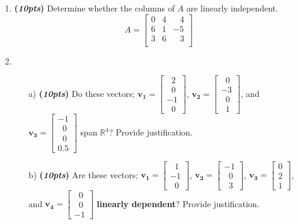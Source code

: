 \documentclass[12pt]{article}%
\begin{document}
\begin{enumerate}
     \newpage



    \item \textbf{(\emph{10pts})} Determine whether the columns of \(A\) are linearly independent.
    \[ A =
    \begin{bmatrix} 0 & 4 & \;\;\;4\\6 & 1 & -5\\ 3 & 6 & \;\;\; 3\\
    \end{bmatrix}
    \]

    \vspace{5cm}
    
    \item 
    \begin{itemize}
         
    \item[a)] \textbf{(\emph{10pts})} Do these vectors; 
    \(\mathbf{v_1} = \begin{bmatrix} \;\;2\\\;\;0\\-1\\\;\;0 \end{bmatrix}\),
    \(\mathbf{v_2} = \begin{bmatrix} \;\;0\\-3\\\;\;0\\\;\;1 \end{bmatrix}\), and 
    \(\mathbf{v_3} = \begin{bmatrix} -1\\\;\;0\\\;\;0\\0.5 \end{bmatrix}\)
    span \(\mathbb{R}^4\)? Provide justification.
    \vspace{5cm}
    
    \item[b)] \textbf{(\emph{10pts})} Are these vectors; 
    \(\mathbf{v_1} = \begin{bmatrix} \;\;1\\-1\\\;\;0 \end{bmatrix}\),
    \(\mathbf{v_2} = \begin{bmatrix}-1\\\;\;0\\\;\;3 \end{bmatrix}\),
    \(\mathbf{v_3} = \begin{bmatrix} 0\\2\\1 \end{bmatrix}\), and 
    \(\mathbf{v_4} = \begin{bmatrix} \;\;0\\\;\;0\\-1 \end{bmatrix}\)
    \textbf{linearly dependent}? Provide justification.
    \end{itemize}
    \vspace{7cm}
    

\end{enumerate}
\end{document}
